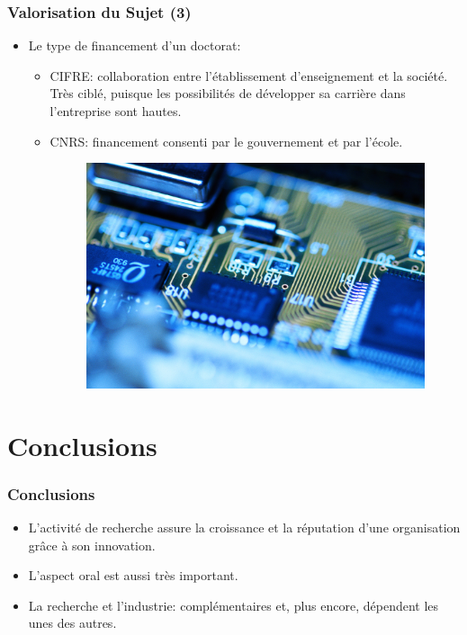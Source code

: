 \documentclass[10pt]{beamer}
\begin{document}
\begin{frame}
\frametitle{Valorisation du Sujet (3)}

\begin {itemize}
\item Le type de financement d'un doctorat: 

\begin {itemize} 
\item CIFRE:  collaboration entre l'établissement d'enseignement et la société.
Très ciblé, puisque les possibilités de développer sa carrière dans l'entreprise
sont hautes.

\item CNRS: financement consenti par le gouvernement et par l'école.

\vspace{12pt}
\begin{figure}[h]
\centering
\includegraphics[scale=0.15]{images/lixo}
\end{figure}
\end{itemize}
\end{itemize}
\end{frame}

\section{Conclusions}

\begin{frame}
\frametitle{Conclusions}


\begin {itemize} 
\item L'activité de recherche assure la croissance et la réputation d'une
organisation grâce à son innovation.

\vspace{12pt}

\item L'aspect oral est aussi très important.

\vspace{12pt}

\item La recherche et l'industrie: complémentaires et, plus encore,
dépendent les unes des autres.

\end{itemize}
\end{frame}
\end{document}
